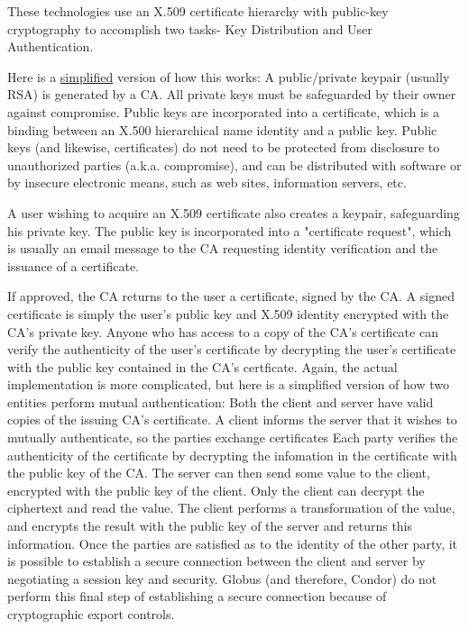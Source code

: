 These technologies use an X.509 certificate hierarchy with public-key 
cryptography to accomplish two tasks- Key Distribution and User Authentication.

Here is a \underline{simplified} version of how this works:
A public/private keypair (usually RSA) is generated by a CA. All private
keys must be safeguarded by their owner against compromise. Public keys are
incorporated into a certificate, which is a binding between an X.500
hierarchical name identity and a public key. Public keys (and likewise,
certificates) do not need to be protected from disclosure to unauthorized
parties (a.k.a. compromise), and can be distributed with software or by
insecure electronic means, such as web sites, information servers, etc.

A user wishing to acquire an X.509 certificate also creates a keypair, 
safeguarding his private key. The public key is incorporated into a 
"certificate request", which is usually an email message to the CA 
requesting identity verification and the issuance of a certificate.

If approved, the CA returns to the user a certificate, signed by the CA.
A signed certificate is simply the user's public key and X.509 identity
encrypted with the CA's private key. Anyone who has access to a copy of
the CA's certificate can verify the authenticity of the user's certificate 
by decrypting the user's certificate with the public key contained in the
CA's certficate. Again, the actual implementation is more complicated, but
here is a simplified version of how two entities perform mutual authentication:
Both the client and server have valid copies of the issuing CA's certificate.
A client informs the server that it wishes to mutually authenticate, so the
parties exchange certificates Each party verifies the authenticity of the
certificate by decrypting the infomation in the certificate with the public
key of the CA.
The server can then send some value to the client, encrypted with the public 
key of the client.  Only the client can decrypt the ciphertext and read the 
value. The client performs a transformation of the value, and encrypts the 
result with the public key of the server and returns this information. Once
the parties are satisfied as to the identity of the other party, it is possible
to establish a secure connection between the client and server by negotiating 
a session key and security. Globus (and therefore, Condor) do not perform
this final step of establishing a secure connection because of cryptographic 
export controls.

